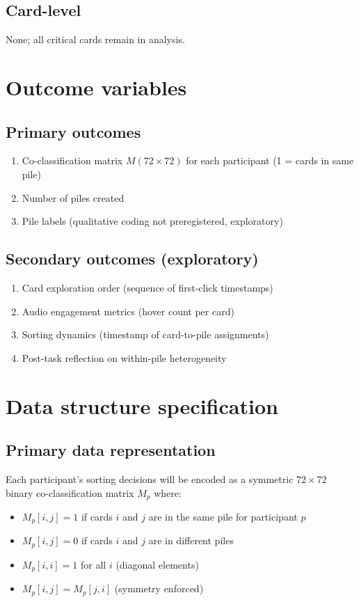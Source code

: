 \documentclass[12pt]{article}
\begin{document}
\begin{enumerate}
\subsection{Card-level}
None; all critical cards remain in analysis.

\section{Outcome variables}
\subsection{Primary outcomes}
\begin{enumerate}
\item Co-classification matrix $M (72\times72)$ for each participant (1 = cards in same pile)
\item Number of piles created
\item Pile labels (qualitative coding not preregistered, exploratory)
\end{enumerate}

\subsection{Secondary outcomes (exploratory)}
\begin{enumerate}
\item Card exploration order (sequence of first-click timestamps)
\item Audio engagement metrics (hover count per card)
\item Sorting dynamics (timestamp of card-to-pile assignments)
\item Post-task reflection on within-pile heterogeneity
\end{enumerate}

\section{Data structure specification}

\subsection{Primary data representation}
Each participant's sorting decisions will be encoded as a symmetric $72 \times 72$ binary co-classification matrix $M_p$ where:
\begin{itemize}
\item $M_p[i,j] = 1$ if cards $i$ and $j$ are in the same pile for participant $p$
\item $M_p[i,j] = 0$ if cards $i$ and $j$ are in different piles  
\item $M_p[i,i] = 1$ for all $i$ (diagonal elements)
\item $M_p[i,j] = M_p[j,i]$ (symmetry enforced)
\end{itemize}


\end{enumerate}
\end{document}
